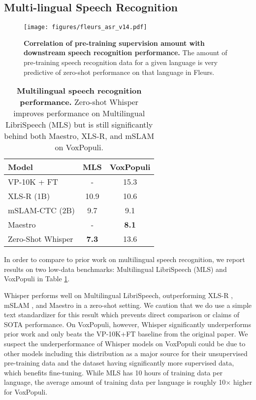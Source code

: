 \subsection{Multi-lingual Speech Recognition}\label{subsec:multi-lingual}

\begin{figure}[t]
\begin{center}
\centerline{\texttt{[image: figures/fleurs\_asr\_v14.pdf]}}
\caption{\textbf{Correlation of pre-training supervision amount with downstream speech recognition performance.} The amount of pre-training speech recognition data for a given language is very predictive of zero-shot performance on that language in Fleurs.}
\label{fleurs_asr_transfer}
\end{center}
\vspace{-1em}
\end{figure}

\begin{table}[t]
\vskip 0.15in
\begin{center}
\begin{tabular}{l|cc}
\toprule
Model & MLS & VoxPopuli \\
\midrule
VP-10K + FT & - & 15.3 \\
XLS-R (1B) & 10.9 & 10.6 \\
mSLAM-CTC (2B) & 9.7 & 9.1 \\
Maestro & - & \textbf{8.1} \\
\midrule
Zero-Shot Whisper & \textbf{7.3} & 13.6 \\
\bottomrule
\end{tabular}
\caption{\textbf{Multilingual speech recognition performance.} Zero-shot Whisper improves performance on Multilingual LibriSpeech (MLS) but is still significantly behind both Maestro, XLS-R, and mSLAM on VoxPopuli.}
\label{multilingual_table}
\end{center}
\vspace{-1em}
\end{table}

In order to compare to prior work on multilingual speech recognition, we report results on two low-data benchmarks: Multilingual LibriSpeech (MLS) \cite{pratap2020mls} and VoxPopuli \cite{wang2021voxpopuli} in Table \ref{multilingual_table}.

Whisper performs well on Multilingual LibriSpeech, outperforming XLS-R \cite{babu2021xlsr}, mSLAM \cite{bapna2022mslam}, and Maestro \cite{chen2022maestro} in a zero-shot setting. We caution that we do use a simple text standardizer for this result which prevents direct comparison or claims of SOTA performance. On VoxPopuli, however, Whisper significantly underperforms prior work and only beats the VP-10K+FT baseline from the original paper. We suspect the underperformance of Whisper models on VoxPopuli could be due to other models including this distribution as a major source for their unsupervised pre-training data and the dataset having significantly more supervised data, which benefits fine-tuning. While MLS has 10 hours of training data per language, the average amount of training data per language is roughly 10$\times$ higher for VoxPopuli.

